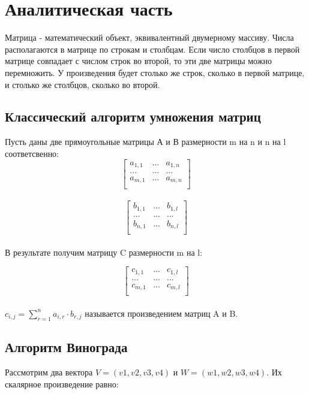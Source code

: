 \documentclass[12pt]{report}
\begin{document}
\chapter{Аналитическая часть}
Матрица - математический объект, эквивалентный двумерному массиву. Числа располагаются в матрице по строкам и столбцам. Если число столбцов в первой матрице совпадает с числом строк во второй, то эти две матрицы можно перемножить. У произведения будет столько же строк, сколько в первой матрице, и столько же столбцов, сколько во второй.
	    
\section{Классический алгоритм умножения матриц}
Пусть даны две прямоугольные матрицы А и В размерности m на n и n на l соответсвенно: 
\[ \begin{bmatrix}
a_{1,1} & ... & a_{1,n} \\
... & ... & ... \\
a_{m,1} & ... & a_{m,n} \\
\end{bmatrix} \]\\

\[ \begin{bmatrix}
b_{1,1} & ... & b_{1,l} \\
... & ... & ... \\
b_{n,1} & ... & b_{n,l} \\
\end{bmatrix} \]\\

В результате получим матрицу C размерности m на l:
	
\[ \begin{bmatrix}
c_{1,1} & ... & c_{1,l} \\
... & ... & ... \\
c_{m,1} & ... & c_{m,l} \\
\end{bmatrix} \]\\


$c_{i,j} = \sum\limits_{r=1}^n a_{i,r}\cdot b_{r,j}$ называется произведением матриц A и B.


\section{Алгоритм Винограда}
Рассмотрим два вектора $V = (v1, v2, v3, v4)$ и $W = (w1, w2, w3, w4)$. Их скалярное произведение равно: 
\end{document}
